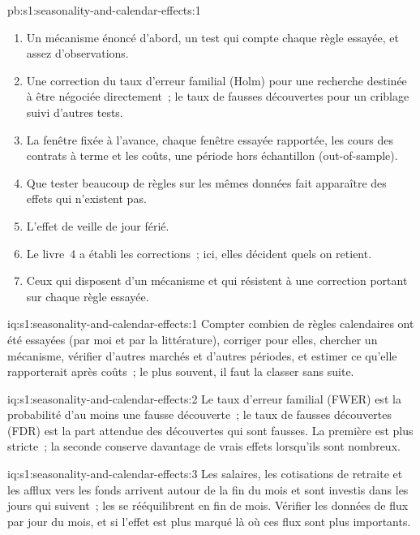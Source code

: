 \begin{solution}{pb:s1:seasonality-and-calendar-effects:1}
\begin{enumerate}
Benjamini--Hochberg), l'effet de veille de jour férié sous aucune~; les fausses découvertes sont au nombre de 8 sans correction, 3 sous Benjamini--Hochberg et 0 sous Bonferroni,
Holm et Benjamini--Yekutieli.
\item Un mécanisme énoncé d'abord, un test qui compte chaque règle essayée, et assez d'observations.
\item Une correction du taux d'erreur familial (Holm) pour une recherche destinée à être négociée directement~; le taux de fausses découvertes pour un criblage suivi d'autres tests.
\item La fenêtre fixée à l'avance, chaque fenêtre essayée rapportée, les cours des contrats à terme et les coûts, une période hors échantillon (out-of-sample).
\item Que tester beaucoup de règles sur les mêmes données fait apparaître des effets qui n'existent pas.
\item L'effet de veille de jour férié.
\item Le livre~4 a établi les corrections~; ici, elles décident quels  on retient.
\item Ceux qui disposent d'un mécanisme et qui résistent à une correction portant sur chaque règle essayée.
\end{enumerate}
\end{solution}

\begin{solution}{iq:s1:seasonality-and-calendar-effects:1}
Compter combien de règles calendaires ont été essayées (par moi et par la littérature), corriger pour elles, chercher un mécanisme, vérifier d'autres marchés et d'autres périodes,
et estimer ce qu'elle rapporterait après coûts~; le plus souvent, il faut la classer sans suite.
\end{solution}

\begin{solution}{iq:s1:seasonality-and-calendar-effects:2}
Le taux d'erreur familial (FWER) est la probabilité d'au moins une fausse découverte~; le taux de fausses découvertes (FDR) est la part attendue des découvertes qui sont
fausses. La première est plus stricte~; la seconde conserve davantage de vrais effets lorsqu'ils sont nombreux.
\end{solution}

\begin{solution}{iq:s1:seasonality-and-calendar-effects:3}
Les salaires, les cotisations de retraite et les afflux vers les fonds arrivent autour de la fin du mois et sont investis dans les jours qui suivent~; les  se rééquilibrent en fin de mois. Vérifier les
données de flux par jour du mois, et si l'effet est plus marqué là où ces flux sont plus importants.
\end{solution}

